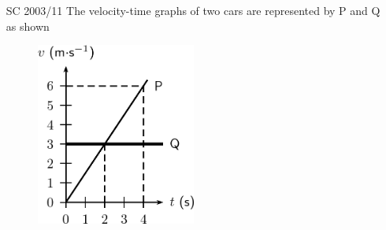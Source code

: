 \begin{enumerate}[noitemsep, label=\textbf{\arabic*}. ]
\begin{center}
\begin{xtabular*}{\mytablewidth}[t]{|p{10\mystarwidth}|p{10\mystarwidth}|p{10\mystarwidth}|p{10\mystarwidth}|}
        (d)%
     \tabularnewline{}
    \end{xtabular*}
      \end{center}
    \begin{center}{\small\bfseries Table 20.6}\end{center}
    
    \addtocounter{footnote}{-0}
    
    \par
          \label{m38796*uid187}\item [SC 2003/11] The velocity-time graphs of two cars are represented by P and Q as shown

    \setcounter{subfigure}{0}


	\begin{figure}[H] %
    \begin{center}
    \label{m38796*id81734!!!underscore!!!media}\label{m38796*id81734!!!underscore!!!printimage}\includegraphics[height=6cm]{col11305.imgs/m38796_PG10C2_051.png} %
        
      \vspace{2pt}
    \vspace{.1in}
    
    \end{center}

 \end{figure}   

    \addtocounter{footnote}{-0}
    

\end{enumerate}

